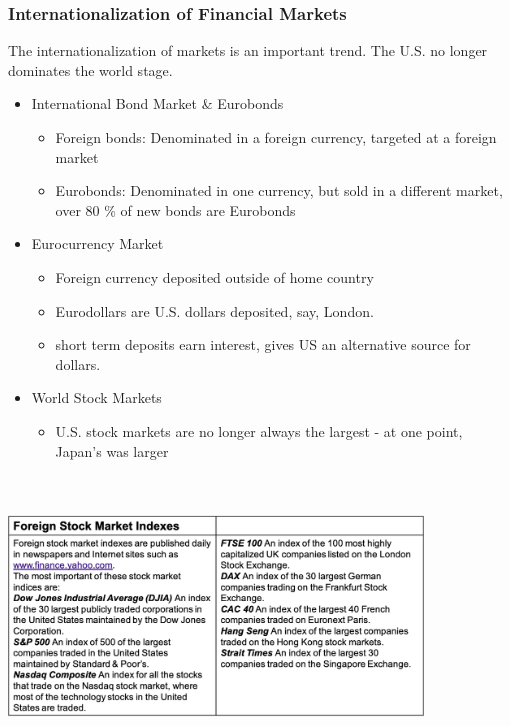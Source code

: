 \documentclass{beamer}
\begin{document}
\begin{frame}
\frametitle{Internationalization of Financial Markets }

The internationalization of markets is an important trend. The U.S. no longer dominates the world stage.
\smallskip
\begin{itemize}
\item International Bond Market \& Eurobonds
\begin{itemize}
\item Foreign bonds: Denominated in a foreign currency, targeted at a foreign market
\item Eurobonds: Denominated in one currency, but sold in a different market, over 80 \% of new bonds are Eurobonds
\end{itemize}

\item Eurocurrency Market
\begin{itemize}
\item Foreign currency deposited outside of home country
\item Eurodollars are U.S. dollars deposited, say, London.
\item short term deposits earn interest, gives US an alternative source for dollars.
\end{itemize}

\item World Stock Markets
\begin{itemize}
\item U.S. stock markets are no longer always the largest - at one point, Japan's was larger
\end{itemize}

\end{itemize}

\end{frame}



\frame
{
\frametitle{ }
\centering \includegraphics[height=7cm,width=11cm]{Picture2}
}
\end{document}
